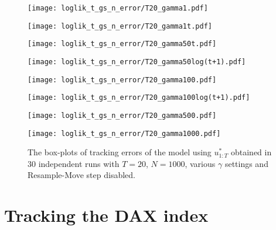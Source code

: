 \begin{figure}[!thbp]
    \centering
    \begin{minipage}{.5\textwidth}
        \centering
        \texttt{[image: loglik\_t\_gs\_n\_error/T20\_gamma1.pdf]}
    \end{minipage}%
    \begin{minipage}{0.5\textwidth}
        \centering
        \texttt{[image: loglik\_t\_gs\_n\_error/T20\_gamma1t.pdf]}
    \end{minipage}
    \begin{minipage}{0.5\textwidth}
        \centering
        \texttt{[image: loglik\_t\_gs\_n\_error/T20\_gamma50t.pdf]}
    \end{minipage}%
    \begin{minipage}{0.5\textwidth}
        \centering
        \texttt{[image: loglik\_t\_gs\_n\_error/T20\_gamma50log(t+1).pdf]}
    \end{minipage}
    \begin{minipage}{0.5\textwidth}
        \centering
        \texttt{[image: loglik\_t\_gs\_n\_error/T20\_gamma100.pdf]}
    \end{minipage}%
    \begin{minipage}{0.5\textwidth}
        \centering
        \texttt{[image: loglik\_t\_gs\_n\_error/T20\_gamma100log(t+1).pdf]}
    \end{minipage}
    \begin{minipage}{0.5\textwidth}
        \centering
        \texttt{[image: loglik\_t\_gs\_n\_error/T20\_gamma500.pdf]}
    \end{minipage}%
    \begin{minipage}{0.5\textwidth}
        \centering
        \texttt{[image: loglik\_t\_gs\_n\_error/T20\_gamma1000.pdf]}
    \end{minipage}
    \caption{The box-plots of tracking errors of the model using $u^*_{1:T}$ obtained in $30$ independent runs with $T=20$, $N=1000$, various $\gamma$ settings and Resample-Move step disabled.}
    \label{fig:error}
\end{figure}


\chapter{Tracking the DAX index}
\graphicspath{{Chapter4/figures/}}
\label{cha:dax}
 
